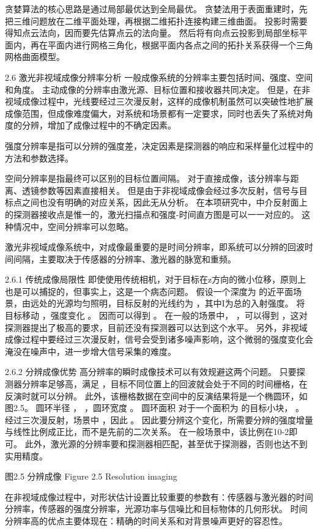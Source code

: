 贪婪算法的核心思路是通过局部最优达到全局最优。
贪婪法用于表面重建时，先把三维问题放在二维平面处理，再根据二维拓扑连接构建三维曲面。
投影时需要得知点云法向，因而要先估算点云的法向量。
然后将有向点云投影到局部坐标平面内，再在平面内进行网格三角化，根据平面内各点之间的拓扑关系获得一个三角网格曲面模型。

2.6  激光非视域成像分辨率分析
一般成像系统的分辨率主要包括时间、强度、空间和角度。
主动成像的分辨率由激光源、目标位置和接收器共同决定。
但是，在非视域成像过程中，光线要经过三次漫反射，这样的成像机制虽然可以突破性地扩展成像范围，但成像难度偏大，对系统和场景都有一定要求，同时也丢失了系统对角度的分辨，增加了成像过程中的不确定因素。

强度分辨率是指可以分辨的强度差，决定因素是探测器的响应和采样量化过程中的方法和参数选择。

空间分辨率是指最终可以区别的目标位置间隔。
对于直接成像，该分辨率与距离、透镜参数等因素直接相关。
但是由于非视域成像会经过多次反射，信号与目标点之间也没有明确的对应关系，因此无从分析。
在本项研究中，中介反射面上的探测器接收点是惟一的，激光扫描点和强度-时间直方图是可以一一对应的。
这种情况中，空间分辨率可以忽略。

激光非视域成像系统中，对成像最重要的是时间分辨率，即系统可以分辨的回波时间间隔，主要取决于传感器的分辨率、激光器的脉宽和重频。

2.6.1  传统成像局限性
即使使用传统相机，对于目标在z方向的微小位移，原则上也是可以捕捉的，但事实上，这是一个病态问题。
假设一个深度为 的近平面场景，由远处的光源均匀照明，目标反射的光线约为 ，其中I为总的入射强度。
将目标移动 ，强度变化 。
因而可以得到 。
在一般的场景中， ，可以得到 ，这对探测器提出了极高的要求，目前还没有探测器可以达到这个水平。
另外，非视域成像过程中要经过三次漫反射，信号会受到诸多噪声影响，这个微弱的强度变化会淹没在噪声中，进一步增大信号采集的难度。

2.6.2  分辨成像优势
高分辨率的瞬时成像技术可以有效规避这两个问题。
只要探测器分辨率足够高，满足  ，目标不同位置上的回波就会处于不同的时间栅格，在反演时就可以分辨。
此外，该栅格数据在空间中的反演结果将是一个椭圆环，如图2.5。
圆环半径 ，  ，圆环宽度 。
圆环面积 对于一个面积为 的目标小块，  。
经过三次漫反射，场景中 ，因此 。
因此要分辨这个变化，所需要分辨的强度增量与线性比例成正比，而不是先前的二次关系。
在一般场景中，该比例在10-2即可。
此外，激光源的分辨率要和探测器相匹配，甚至优于探测器，否则也达不到实用精度。


 
图2.5  分辨成像
Figure 2.5 Resolution imaging

在非视域成像过程中，对形状估计设置比较重要的参数有：传感器与激光器的时间分辨率，传感器的强度分辨率，光源功率与信噪比和目标物体的几何形状。
时间分辨率高的优点主要体现在：精确的时间关系和对背景噪声更好的容忍性。

